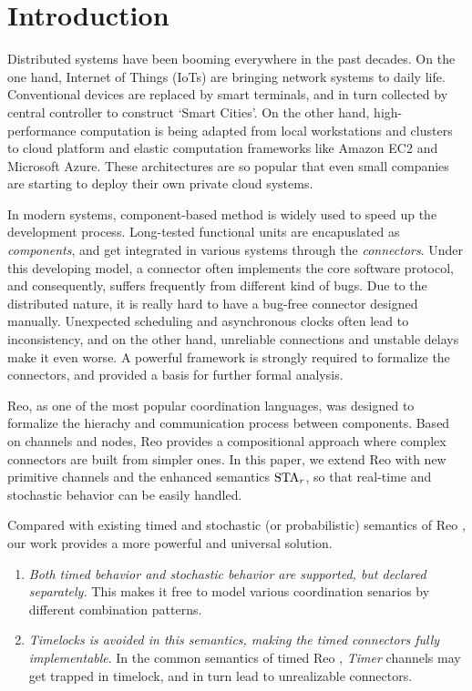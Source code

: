 \section{Introduction}
\label{sec:intro}

Distributed systems have been booming everywhere in the past decades. On the one hand, Internet of Things (IoTs) are bringing network systems to daily life. Conventional devices are replaced by smart terminals, and in turn collected by central controller to construct `Smart Cities'. On the other hand, high-performance computation is being adapted from local workstations and clusters to cloud platform and elastic computation frameworks like Amazon EC2\cite{Newcombe2015} and Microsoft Azure\cite{Li2009}. These architectures are so popular that even small companies are starting to deploy their own private cloud systems. 

In modern systems, component-based method is widely used to speed up the development process. Long-tested functional units are encapuslated as \emph{components}, and get integrated in various systems through the \emph{connectors}. Under this developing model, a connector often implements the core software protocol, and consequently, suffers frequently from different kind of bugs.
Due to the distributed nature, it is really hard to have a bug-free connector designed manually. Unexpected scheduling and asynchronous clocks often lead to inconsistency, and on the other hand, unreliable connections and unstable delays make it even worse. A powerful framework is strongly required to formalize the connectors, and provided a basis for further formal analysis.

Reo\cite{ARBAB2004}, as one of the most popular coordination languages, was designed to formalize the hierachy and communication process between components. Based on channels and nodes, Reo provides a compositional approach where complex connectors are built from simpler ones.
In this paper, we extend Reo with new primitive channels and the enhanced semantics $\mbox{STA}_r$, so that real-time and stochastic behavior can be easily handled.

Compared with existing timed and stochastic (or probabilistic) semantics of Reo \cite{Meng2012,Meng2007,Baier2006,Arbab2009}, our work provides a more powerful and universal solution. 
\begin{enumerate}
    \item \emph{Both timed behavior and stochastic behavior are supported, but declared separately.} This makes it free to model various coordination senarios by different combination patterns.
    \item \emph{Timelocks is avoided in this semantics, making the timed connectors fully implementable}. In the common semantics of timed Reo \cite{Arbab2006,Meng2012}, \emph{Timer} channels may get trapped in timelock, and in turn lead to unrealizable connectors.
\end{enumerate}

